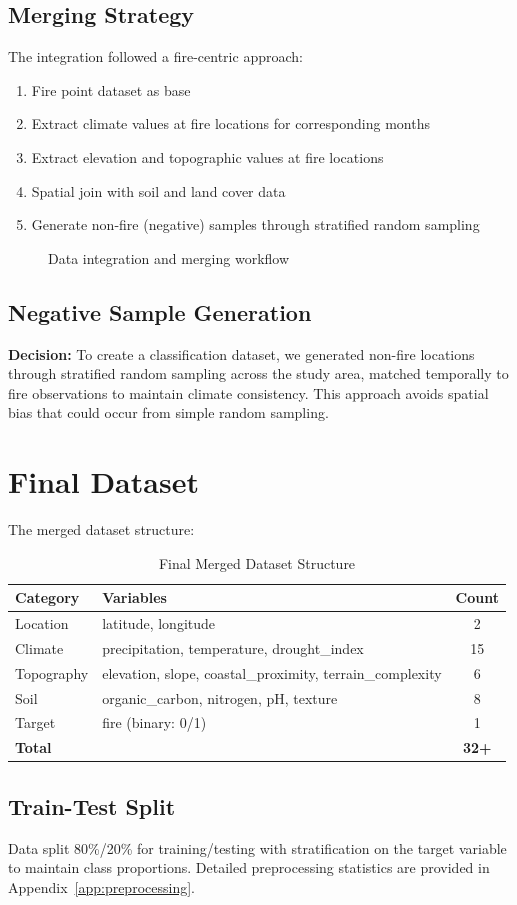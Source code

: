 \subsection*{Merging Strategy}
The integration followed a fire-centric approach:
\begin{enumerate}
    \item Fire point dataset as base
    \item Extract climate values at fire locations for corresponding months
    \item Extract elevation and topographic values at fire locations
    \item Spatial join with soil and land cover data
    \item Generate non-fire (negative) samples through stratified random sampling
\end{enumerate}

\begin{figure}[H]
    \centering
    \caption{Data integration and merging workflow}
    \label{fig:merging_flowchart}
\end{figure}

\subsection*{Negative Sample Generation}
\textbf{Decision:} To create a classification dataset, we generated non-fire locations through stratified random sampling across the study area, matched temporally to fire observations to maintain climate consistency. This approach avoids spatial bias that could occur from simple random sampling.

\section{Final Dataset}

The merged dataset structure:

\begin{table}[H]
\centering
\caption{Final Merged Dataset Structure}
\label{tab:merged_structure}
\begin{tabular}{|l|l|c|}
\hline
\textbf{Category} & \textbf{Variables} & \textbf{Count} \\
\hline
Location & latitude, longitude & 2 \\
Climate & precipitation, temperature, drought\_index & 15 \\
Topography & elevation, slope, coastal\_proximity, terrain\_complexity & 6 \\
Soil & organic\_carbon, nitrogen, pH, texture & 8 \\
Target & fire (binary: 0/1) & 1 \\
\hline
\textbf{Total} & & \textbf{32+} \\
\hline
\end{tabular}
\end{table}

\subsection*{Train-Test Split}
Data split 80\%/20\% for training/testing with stratification on the target variable to maintain class proportions. Detailed preprocessing statistics are provided in Appendix~\ref{app:preprocessing}.
